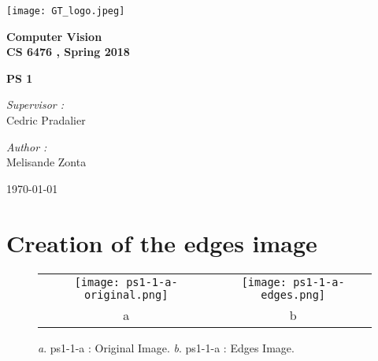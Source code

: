 \documentclass[a4paper,11pt]{article}
\begin{document}

\begin{titlepage}

\begin{center}
\texttt{[image: GT\_logo.jpeg]}
\end{center}
\hrulefill
\begin{center}\bfseries\huge
   Computer Vision \\
   CS 6476 , Spring 2018\\
   \end{center}
  \begin{center}\bfseries\large
     PS 1\\
    \hrulefill
\end{center}
\vspace*{1cm}
\begin{minipage}[t]{0.6\textwidth}
  \begin{flushleft} \large
    \emph{Supervisor : }\\
    Cedric Pradalier \\
  \end{flushleft}
\end{minipage}
\begin{minipage}[t]{0.3\textwidth}
  \begin{flushright} \large
    \emph{Author :} \\
    Melisande Zonta \\
  \end{flushright}
\end{minipage}
\begin{flushright}
       \today 
\end{flushright} 
\end{titlepage}

\tableofcontents
\clearpage

\section{Creation of the edges image}



 \begin{figure}[H]
\begin{center}
\begin{tabular}{cc}
	\texttt{[image: ps1-1-a-original.png]}&
	\texttt{[image: ps1-1-a-edges.png]}\\
	a&b
\end{tabular}
\end{center}
\caption{ 
\textit{a}. ps1-1-a : Original Image. \textit{b}. ps1-1-a : Edges Image.}
\label{ps1-1-a}
\end{figure}
\end{document}
